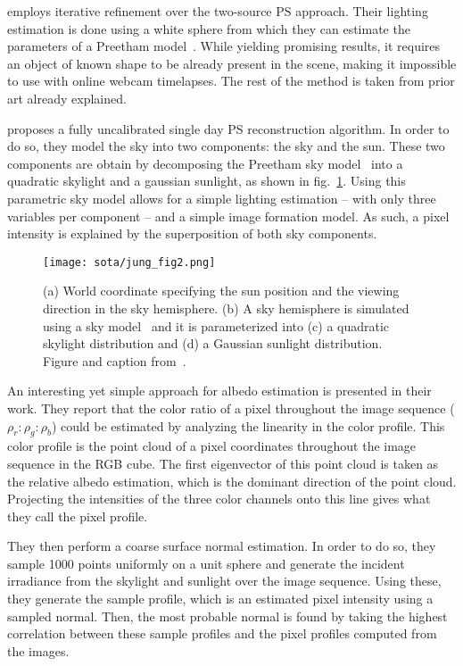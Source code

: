 \cite{inose-tcva-13} employs iterative refinement over the two-source PS approach. Their lighting estimation is done using a white sphere from which they can estimate the parameters of a Preetham model~\cite{preetham-siggraph-99}. While yielding promising results, it requires an object of known shape to be already present in the scene, making it impossible to use with online webcam timelapses. The rest of the method is taken from prior art already explained.

\cite{jung-cvpr-15} proposes a fully uncalibrated single day PS reconstruction algorithm. In order to do so, they model the sky into two components: the sky and the sun. These two components are obtain by decomposing the Preetham sky model~\cite{preetham-siggraph-99} into a quadratic skylight and a gaussian sunlight, as shown in fig.~\ref{fig:jung-skysim}. Using this parametric sky model allows for a simple lighting estimation -- with only three variables per component -- and a simple image formation model. As such, a pixel intensity is explained by the superposition of both sky components.

\begin{figure}
\centering
\texttt{[image: sota/jung\_fig2.png]}
\caption{(a) World coordinate specifying the sun position and the viewing direction in the sky hemisphere. (b) A sky hemisphere is simulated using a sky model~\cite{preetham-siggraph-99} and it is parameterized into (c) a quadratic skylight distribution and (d) a Gaussian sunlight distribution. Figure and caption from~\cite{jung-cvpr-15}.}
\label{fig:jung-skysim}
\end{figure}

An interesting yet simple approach for albedo estimation is presented in their work. They report that the color ratio of a pixel throughout the image sequence ($\rho_r : \rho_g : \rho_b$) could be estimated by analyzing the linearity in the color profile. This color profile is the point cloud of a pixel coordinates throughout the image sequence in the RGB cube. The first eigenvector of this point cloud is taken as the relative albedo estimation, which is the dominant direction of the point cloud. Projecting the intensities of the three color channels onto this line gives what they call the pixel profile.

They then perform a coarse surface normal estimation. In order to do so, they sample 1000 points uniformly on a unit sphere and generate the incident irradiance from the skylight and sunlight over the image sequence. Using these, they generate the sample profile, which is an estimated pixel intensity using a sampled normal. Then, the most probable normal is found by taking the highest correlation between these sample profiles and the pixel profiles computed from the images.

